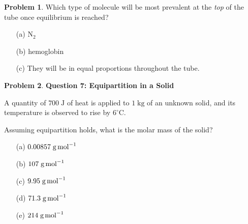 \documentclass[10pt]{article}
\theoremstyle{definition} %
\newtheorem{problem}{Problem}
\theoremstyle{plain} %
\begin{document}
\begin{problem}
                            Which type of molecule will be most prevalent at the \emph{top} of the
                            tube once equilibrium is reached?
                            
                            \begin{enumerate}
                              \item[(a)] \(\mathrm{N_2}\)
                              \item[(b)] hemoglobin
                              \item[(c)] They will be in equal proportions throughout the tube.
                            \end{enumerate}
                            \end{problem}
                            \begin{problem}
                              \textbf{Question 7: Equipartition in a Solid}
                              
                              A quantity of \(700\;\text{J}\) of heat is applied to \(1\;\text{kg}\) of an unknown solid, and its temperature is observed to rise by \(6^{\circ}\text{C}\).
                              
                              Assuming equipartition holds, what is the molar mass of the solid?
                              
                              \begin{enumerate}
                                \item[(a)] \(0.00857\;\text{g\,mol}^{-1}\)
                                \item[(b)] \(107\;\text{g\,mol}^{-1}\)
                                \item[(c)] \(9.95\;\text{g\,mol}^{-1}\)
                                \item[(d)] \(71.3\;\text{g\,mol}^{-1}\)
                                \item[(e)] \(214\;\text{g\,mol}^{-1}\)
                              \end{enumerate}
                              \end{problem}
\end{document}
